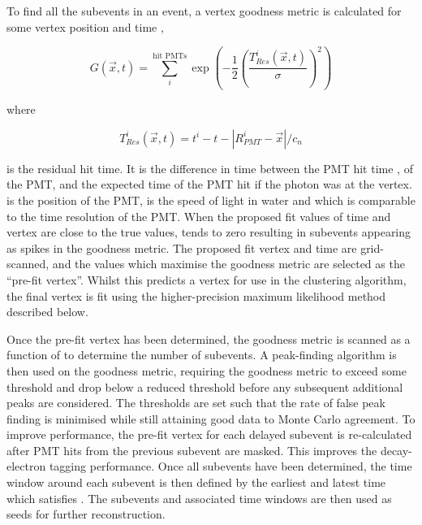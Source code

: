 To find all the subevents in an event, a vertex goodness metric is calculated for some vertex position  and time ,


\begin{equation}
  G(\vec{x},t) = \sum^{\text{hit PMTs}}_{i} \exp \left( - \frac{1}{2} \left( \frac{T_{Res}^{i}(\vec{x},t)}{\sigma} \right)^{2} \right)
\end{equation}

where

\begin{equation}
  T_{Res}^{i}(\vec{x},t) = t^{i} - t - \left| R^{i}_{PMT} - \vec{x} \right|/c_{n}
\end{equation}

is the residual hit time. It is the difference in time between the PMT hit time , of the  PMT, and the expected time of the PMT hit if the photon was at the vertex.  is the position of the  PMT,  is the speed of light in water and  which is comparable to the time resolution of the PMT. When the proposed fit values of time and vertex are close to the true values,  tends to zero resulting in subevents appearing as spikes in the goodness metric. The proposed fit vertex and time are grid-scanned, and the values which maximise the goodness metric are selected as the ``pre-fit vertex''. Whilst this predicts a vertex for use in the clustering algorithm, the final vertex is fit using the higher-precision maximum likelihood method described below.

Once the pre-fit vertex has been determined, the goodness metric is scanned as a function of  to determine the number of subevents. A peak-finding algorithm is then used on the goodness metric, requiring the goodness metric to exceed some threshold and drop below a reduced threshold before any subsequent additional peaks are considered. The thresholds are set such that the rate of false peak finding is minimised while still attaining good data to Monte Carlo agreement. To improve performance, the pre-fit vertex for each delayed subevent is re-calculated after PMT hits from the previous subevent are masked. This improves the decay-electron tagging performance. Once all subevents have been determined, the time window around each subevent is then defined by the earliest and latest time which satisfies . The subevents and associated time windows are then used as seeds for further reconstruction.

